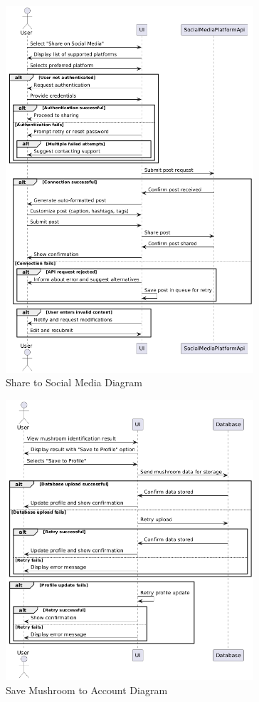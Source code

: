 \documentclass[]{article}
\begin{document}
\vspace{1.5cm}

\begin{figure}[H]
    \centering
    \includegraphics[width=0.82\textwidth]{sharetosocialmedia.png}
    \caption{Share to Social Media Diagram}
    \label{fig:identify}
\end{figure}

\vspace{0.4cm}

\begin{figure}[H]
    \centering
    \includegraphics[width=0.82\textwidth]{savemushroom.png}
    \caption{Save Mushroom to Account Diagram}
    \label{fig:recipe}
\end{figure}
\end{document}

